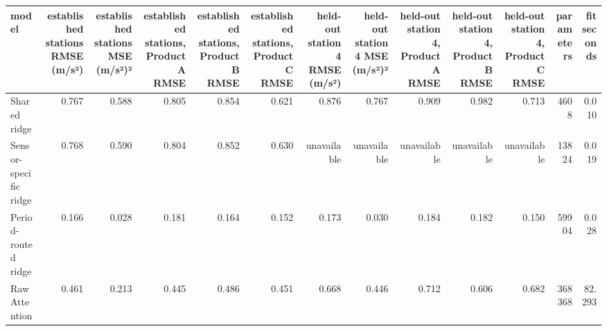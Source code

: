 \begin{tabular}{lrrrrrrrrrrrr}
\toprule
model & established stations RMSE (m/s²) & established stations MSE (m/s²)² & established stations, Product A RMSE & established stations, Product B RMSE & established stations, Product C RMSE & held-out station 4 RMSE (m/s²) & held-out station 4 MSE (m/s²)² & held-out station 4, Product A RMSE & held-out station 4, Product B RMSE & held-out station 4, Product C RMSE & parameters & fit seconds \\
\midrule
Shared ridge & 0.767 & 0.588 & 0.805 & 0.854 & 0.621 & 0.876 & 0.767 & 0.909 & 0.982 & 0.713 & 4608 & 0.010 \\
Sensor-specific ridge & 0.768 & 0.590 & 0.804 & 0.852 & 0.630 & unavailable & unavailable & unavailable & unavailable & unavailable & 13824 & 0.019 \\
Period-routed ridge & 0.166 & 0.028 & 0.181 & 0.164 & 0.152 & 0.173 & 0.030 & 0.184 & 0.182 & 0.150 & 59904 & 0.028 \\
Raw Attention & 0.461 & 0.213 & 0.445 & 0.486 & 0.451 & 0.668 & 0.446 & 0.712 & 0.606 & 0.682 & 368368 & 82.293 \\
\bottomrule
\end{tabular}
